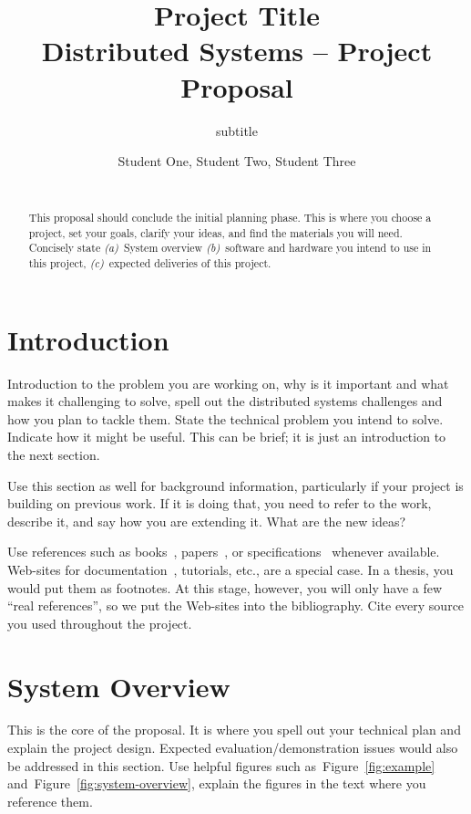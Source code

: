 \documentclass{report}
\title{Project Title\\
\normalsize{Distributed Systems -- Project Proposal}}
\subtitle{subtitle}
\author{
%
%
\alignauthor \normalsize{Student One,  Student Two, Student Three}\\
	\affaddr{\normalsize{ETH ID-1 XX-XXX-XXX, ETH ID-2 XX-XXX-XXX, ETH ID-3 XX-XXX-XXX}}\\
	\email{\normalsize{one@student.ethz.ch, two@student.ethz.ch, three@student.ethz.ch}}
}
\newcommand{\rfig}[1]{Figure~\ref{fig:#1}}
\begin{document}
\maketitle

\begin{abstract}
This proposal should conclude the initial planning phase. This is where you choose a project, set your goals,
clarify your ideas, and find the materials you will need. 
Concisely state 
\textit{(a)}~System overview
\textit{(b)}~software and hardware you intend to use in this project,
\textit{(c)}~expected deliveries of this project.
\end{abstract}

\section{Introduction}

Introduction to the problem you are working on, why is it important and
what makes it challenging to solve, spell out the distributed systems challenges and how you plan to tackle them. 
State the technical problem you intend to solve. Indicate how it might be useful. This can be brief; it is just
an introduction to the next section.

Use this section as well for background information, particularly if your project is building on
previous work. If it is doing that, you need to refer to the work, describe it,
and say how you are extending it. What are the new ideas?

Use references such as books~\cite{hello}, papers~\cite{REST}, or specifications~\cite{RFC2616} whenever available.
Web-sites for documentation~\cite{devServices}, tutorials, etc., are a special case.
In a thesis, you would put them as footnotes.
At this stage, however, you will only have a few ``real references'',
so we put the Web-sites into the bibliography.
Cite every source you used throughout the project.

\section{System Overview}

This is the core of the proposal.
It is where you spell out your technical plan and explain the project design.
Expected evaluation/demonstration issues would also be addressed in this section.
Use helpful figures such as~\rfig{example} and~\rfig{system-overview},
explain the figures in the text where you reference them. 
\end{document}
